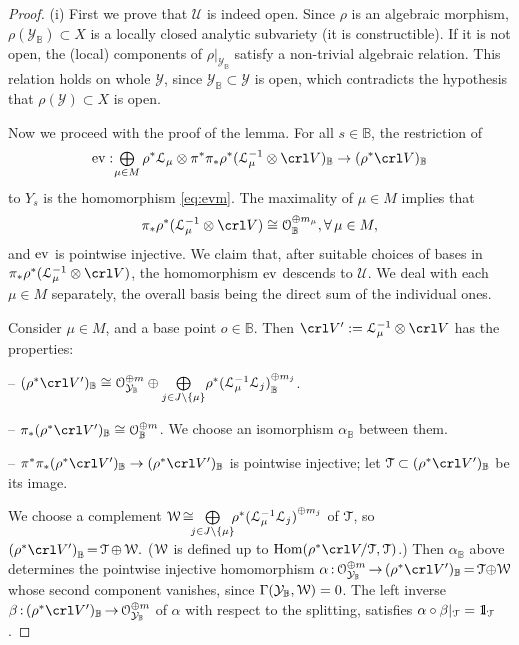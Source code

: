 \documentclass[11pt,reqno]{amsart}
\let\euf\EuScript
\let\cal\mathcal
\let\mbb\mathbb
\let\nit\noindent
\numberwithin{equation}{section}
\numberwithin{figure}{section}
\let\sm\setminus
\begin{document}
\begin{proof} \nit(i) 
First we prove that ${{\cal U}}$ is indeed open. 
Since $\rho$ is an algebraic morphism, $\rho({{\cal Y}}_{{\mbb B}})\subset X$ is a locally closed 
analytic subvariety (it is constructible). If it is not open, the (local) components of 
$\rho|_{{{\cal Y}}_{{\mbb B}}}$ satisfy a non-trivial algebraic relation. This relation holds on 
whole ${{\cal Y}}$, since ${{\cal Y}}_{{\mbb B}}\subset{{\cal Y}}$ is open, which contradicts the hypothesis that 
$\rho({{\cal Y}})\subset X$ is open. 

Now we proceed with the proof of the lemma. For all $s\in{{\mbb B}}$, the restriction of  
$$
{{\rm ev}}:\kern-.5ex
\underset{\mu\in M}{\mbox{$\bigoplus$}}\,
\rho^*{{\euf L}}_\mu\otimes\pi^*\pi_*\rho^*({{\euf L}}_\mu^{-1}\otimes\crl V)_{{\mbb B}}
\to (\rho^*\crl V)_{{\mbb B}}
$$
to $Y_s$ is the homomorphism \eqref{eq:evm}. 
The maximality of $\mu\in M$ implies that 
$$
\pi_*\rho^*({{\euf L}}_\mu^{-1}\otimes\crl V)\cong{{\euf O}}_{{\mbb B}}^{\oplus m_\mu}, 
\forall\,\mu\in M,
$$
and ${{\rm ev}}$ is pointwise injective. We claim that, after suitable choices of bases in 
$\pi_*\rho^*({{\euf L}}_\mu^{-1}\otimes\crl V)$, the homomorphism ${{\rm ev}}$ descends to ${{\cal U}}$. 
We deal with each $\mu\in M$ separately, the overall basis being the direct sum 
of the individual ones. 

Consider $\mu\in M$, and a base point $o\in{{\mbb B}}$. 
Then $\crl V':={{\euf L}}_\mu^{-1}\otimes\crl V$ has the properties:
\smallskip

-- $(\rho^*\crl V')_{{\mbb B}}\cong{{\euf O}}_{{{\cal Y}}_{{\mbb B}}}^{\oplus m}\oplus
\underset{j\in J\sm\{\mu\}}{\bigoplus}
\rho^*{({{\euf L}}_\mu^{-1}{{\euf L}}_j)}^{\oplus m_j}_{{\mbb B}}$. 

-- $\pi_*(\rho^*\crl V')_{{\mbb B}}\cong{{\euf O}}_{{\mbb B}}^{\oplus m}$. 
We choose an isomorphism $\alpha_{{\mbb B}}$ between them.
\smallskip

-- $\pi^*\pi_*(\rho^*\crl V')_{{\mbb B}}\to (\rho^*\crl V')_{{\mbb B}}$ 
is pointwise injective; let ${{\euf T}}\subset (\rho^*\crl V')_{{\mbb B}}$ be its image.
\medskip

\nit We choose a complement 
${{\euf W}}\,{\cong}\kern-.5ex\underset{j\in J\sm\{\mu\}}{\bigoplus}\kern-.5ex
\rho^*{({{\euf L}}_\mu^{-1}{{\euf L}}_j)}^{\oplus m_j}$ of ${{\euf T}}$, so 
${(\rho^*\crl V')}_{{\mbb B}}\,{=}\,{{\euf T}}\,{\oplus}\,{{\euf W}}.$ 
(${{\euf W}}$ is defined up to ${\mathop{\rm Hom}\nolimits}(\rho^*\crl V/{{\euf T}},{{\euf T}})$.) 
Then $\alpha_{{\mbb B}}$ above determines the pointwise injective homomorphism 
$\alpha\,{:}\,{{\euf O}}_{{{\cal Y}}_{{\mbb B}}}^{\oplus m}\,{\to}\,(\rho^*\crl V')_{{\mbb B}}\,
{=}\,{{\euf T}}{\oplus}{{\euf W}}$ 
whose second component vanishes, since $\Gamma({{\cal Y}}_{{\mbb B}},{{\euf W}})=0$. 
The left inverse $\beta\,{:}\,(\rho^*\crl V')_{{\mbb B}}\,{\to}\,{{\euf O}}_{{{\cal Y}}_{{\mbb B}}}^{\oplus m}$ 
of $\alpha$ with respect to the splitting, satisfies $\alpha\circ\beta|_{{\euf T}}={{1\kern-0.57ex\rm l}}_{{\euf T}}$. 


\end{proof}
\end{document}
